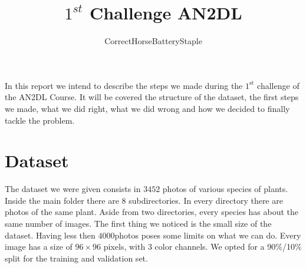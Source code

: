 \documentclass[a4paper,12pt]{article}
\numberwithin{equation}{section}
\begin{document}
\title{\vspace{-3cm}\(1^{st}\) Challenge AN2DL}
\author{CorrectHorseBatteryStaple}
\date{}
\maketitle
In this report we intend to describe the steps we made during the \(1^{\text{st}}\) challenge of the AN2DL Course. It will be covered the structure of the dataset, the first steps we made, what we did right, what we did wrong and how we decided to finally tackle the problem.
\section*{Dataset}
The dataset we were given consists in \(3452\) photos of various species of plants. Inside the main folder there are \(8\) subdirectories. In every directory there are photos of the same plant. Aside from two directories, every species has about the same number of images. The first thing we noticed is the small size of the dataset. Having less then \(4000\)photos poses some limits on what we can do. Every image has a size of \(96 \times 96\) pixels, with \(3\) color channels. We opted for a 90\%/10\% split for the training and validation set.
\end{document}

